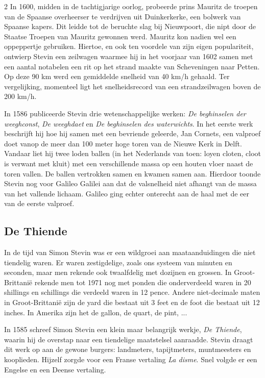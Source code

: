 \begin{multicols}{2}
    In 1600, midden in de tachtigjarige oorlog, probeerde prins Mauritz de troepen van de Spaanse overheerser te verdrijven uit Duinkerkerke, een bolwerk van Spaanse kapers. Dit leidde tot de beruchte slag bij Nieuwpoort, die nipt door de Staatse Troepen van Mauritz gewonnen werd. Mauritz kon nadien wel een oppeppertje gebruiken. Hiertoe, en ook ten voordele van zijn eigen populariteit, ontwierp Stevin een zeilwagen waarmee hij in het voorjaar van 1602 samen met een aantal notabelen een rit op het strand maakte van Scheveningen naar Petten. Op deze 90 km werd een gemiddelde snelheid van 40 km/h gehaald. Ter vergelijking, momenteel ligt het snelheidsrecord van een strandzeilwagen boven de 200 km/h.

 
    In 1586 publiceerde Stevin drie wetenschappelijke werken: \emph{De beghinselen der weeghconst}, \emph{De weeghdaet} en \emph{De beghinselen des waterwichts}. In het eerste werk beschrijft hij hoe hij samen met een bevriende geleerde, Jan Cornets, een valproef doet vanop de meer dan 100 meter hoge toren van de Nieuwe Kerk in Delft. Vandaar liet hij twee loden ballen (in het Nederlands van toen: loyen cloten, cloot is verwant met kluit) met een verschillende massa op een houten vloer naast de toren vallen. De ballen vertrokken samen en kwamen samen aan. Hierdoor toonde Stevin nog voor Galileo Galilei aan dat de valsnelheid niet afhangt van de massa van het vallende lichaam. Galileo ging echter onterecht aan de haal met de eer van de eerste valproef.
    \subsection*{De Thiende}

    In de tijd van Simon Stevin was er een wildgroei aan maataanduidingen die niet tiendelig waren. Er waren zestigdelige, zoals ons systeem van minuten en seconden, maar men rekende ook twaalfdelig met dozijnen en grossen. In Groot-Brittanië rekende men tot 1971 nog met ponden die onderverdeeld waren in 20 shillings en schillings die verdeeld waren in 12 pence. Andere niet-decimale maten in Groot-Brittanië zijn de yard die bestaat uit 3 feet en de foot die bestaat uit 12 inches. In Amerika zijn het de gallon, de quart, de pint, ... 
    
    In 1585 schreef Simon Stevin een klein maar belangrijk werkje, \emph{De Thiende}, waarin hij de overstap naar een tiendelige maatstelsel aanraadde. Stevin draagt dit werk op aan de gewone burgers: landmeters, tapijtmeters, muntmeesters en kooplieden. Hijzelf zorgde voor een Franse vertaling \emph{La disme}. Snel volgde er een Engelse en een Deense vertaling.


\end{multicols}
